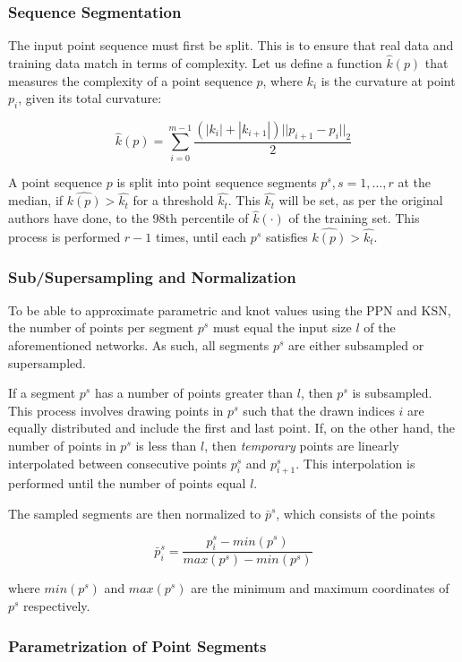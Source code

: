 \subsubsection{Sequence Segmentation}
The input point sequence must first be split. This is to ensure that real data and training data match in terms of complexity. Let us define a function $\hat{k}(p)$ that measures the complexity of a point sequence $p$, where $k_{i}$ is the curvature at point $p_{i}$, given its total curvature:

$$ \hat{k}(p) = \sum_{i=0}^{m-1}\frac{(|k_{i}| + |k_{i + 1}|) \lvert\rvert  p_{i + 1} - p_{i} \lvert\rvert _{2}}{2} $$

A point sequence $p$ is split into point sequence segments $p^{s}, s = 1, \ldots, r$ at the median, if $\hat{k(p)} > \hat{k_{t}}$ for a threshold $\hat{k_{t}}$. This $\hat{k_{t}}$ will be set, as per the original authors have done, to the 98th percentile of $\hat{k}(\cdot)$ of the training set. This process is performed $r - 1$ times, until each $p^{s}$ satisfies $\hat{k(p)} > \hat{k_{t}}$.

\subsubsection{Sub/Supersampling and Normalization}
To be able to approximate parametric and knot values using the PPN and KSN, the number of points per segment $p^{s}$ must equal the input size $l$ of the aforementioned networks. As such, all segments $p^{s}$ are either subsampled or supersampled.

If a segment $p^{s}$ has a number of points greater than $l$, then $p^{s}$ is subsampled. This process involves drawing points in $p^{s}$ such that the drawn indices $i$ are equally distributed and include the first and last point. If, on the other hand, the number of points in $p^{s}$ is less than $l$, then \textit{temporary} points are linearly interpolated between consecutive points $p^{s}_{i}$ and $p^{s}_{i + 1}$. This interpolation is performed until the number of points equal $l$.

The sampled segments are then normalized to $\bar{p}^{s}$, which consists of the points

$$ \bar{p}^{s}_{i} = \frac{p^{s}_{i} - min(p^{s})}{max(p^{s}) - min(p^{s})} $$

where $min(p^{s})$ and $max(p^{s})$ are the minimum and maximum coordinates of $p^{s}$ respectively.

\subsubsection{Parametrization of Point Segments}

